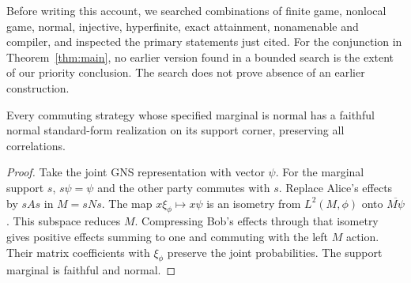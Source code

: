 Before writing this account, we searched combinations of finite game, nonlocal game, normal, injective, hyperfinite, exact attainment, nonamenable and compiler, and inspected the primary statements just cited. For the conjunction in Theorem~\ref{thm:main}, no earlier version found in a bounded search is the extent of our priority conclusion. The search does not prove absence of an earlier construction.

\begin{lemma}\label{lem:support}
Every commuting strategy whose specified marginal is normal has a faithful normal standard-form realization on its support corner, preserving all correlations.
\end{lemma}
\begin{proof}
Take the joint GNS representation with vector $\psi$. For the marginal support $s$, $s\psi=\psi$ and the other party commutes with $s$. Replace Alice's effects by $sAs$ in $M=sNs$. The map $x\xi_\phi\mapsto x\psi$ is an isometry from $L^2(M,\phi)$ onto $\overline{M\psi}$. This subspace reduces $M$. Compressing Bob's effects through that isometry gives positive effects summing to one and commuting with the left $M$ action. Their matrix coefficients with $\xi_\phi$ preserve the joint probabilities. The support marginal is faithful and normal.
\end{proof}
